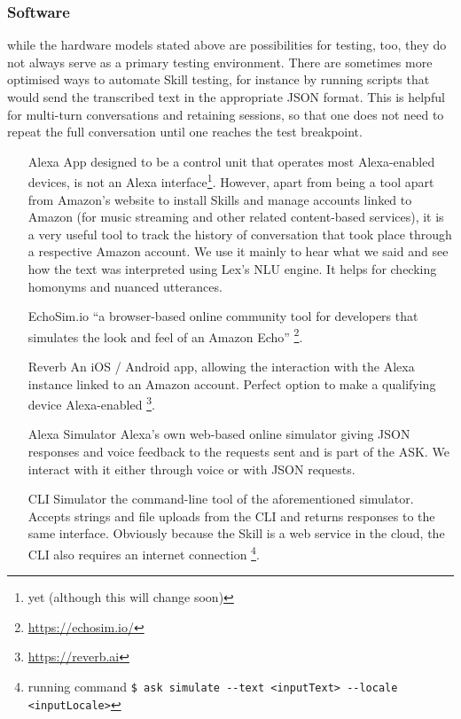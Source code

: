 



\subsubsection*{Software}



while the hardware models stated above are possibilities for testing, too, they do not always serve as a primary testing environment. There are sometimes more optimised ways to automate Skill testing, for instance by running scripts that would send the transcribed text in the appropriate JSON format. This is helpful for multi-turn conversations and retaining sessions, so that one does not need to repeat the full conversation until one reaches the test breakpoint.

\begin{itemize}
	
	\item[Alexa App] designed to be a control unit that operates most Alexa-enabled devices, is not an Alexa interface\footnote{yet (although this will change soon)}. However, apart from being a tool apart from Amazon's website to install Skills and manage accounts linked to Amazon (for music streaming and other related content-based services), it is a very useful tool to track the history of conversation that took place through a respective Amazon account. We use it mainly to hear what we said and see how the text was interpreted using Lex's NLU engine. It helps for checking homonyms and nuanced utterances.
	
	
	\item[EchoSim.io] ``a browser-based online community tool for developers that simulates the look and feel of an Amazon Echo'' \footnote{\url{https://echosim.io/}}. %
	
	\item[Reverb] An iOS / Android app, allowing the interaction with the Alexa instance linked to an Amazon account. Perfect option to make a qualifying device Alexa-enabled \footnote{\url{https://reverb.ai}}. 
	
	\item[Alexa Simulator] Alexa's own web-based online simulator giving JSON responses and voice feedback to the requests sent and is part of the ASK. We interact with it either through voice or with JSON requests. 
	
	\item[CLI Simulator] the command-line tool of the aforementioned simulator. Accepts strings and file uploads from the CLI and returns responses to the same interface. Obviously because the Skill is a web service in the cloud, the CLI also requires an internet connection \footnote{running command \lstinline|$ ask simulate --text <inputText> --locale <inputLocale>|}.
	
\end{itemize}



